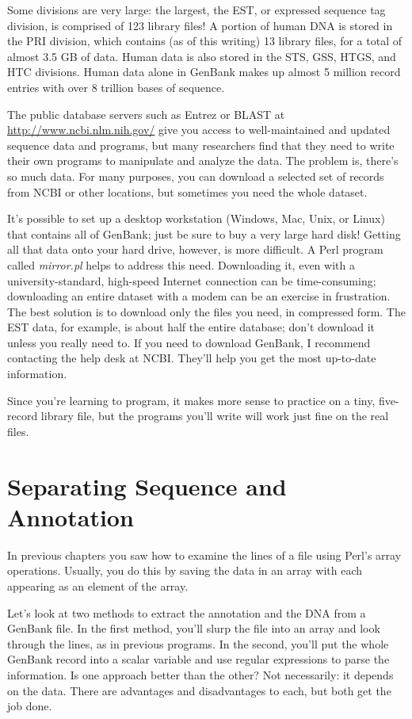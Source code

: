 Some divisions are very large: the largest, the EST, or expressed sequence tag division, is comprised of 123 library files! A portion of human DNA is stored in the PRI division, which contains (as of this writing) 13 library files, for a total of almost 3.5 GB of data. Human data is also stored in the STS, GSS, HTGS, and HTC divisions. Human data alone in GenBank makes up almost 5 million record entries with over 8 trillion bases of sequence.

The public database servers such as Entrez or BLAST at \href{http://www.ncbi.nlm.nih.gov/}{http://www.ncbi.nlm.nih.gov/} give you access to well-maintained and updated sequence data and programs, but many researchers find that they need to write their own programs to manipulate and analyze the data. The problem is, there's so much data. For many purposes, you can download a selected set of records from NCBI or other locations, but sometimes you need the whole dataset.

It's possible to set up a desktop workstation (Windows, Mac, Unix, or Linux) that contains all of GenBank; just be sure to buy a very large hard disk! Getting all that data onto your hard drive, however, is more difficult. A Perl program called \textit{mirror.pl} helps to address this need.  Downloading it, even with a university-standard, high-speed Internet connection can be time-consuming; downloading an entire dataset with a modem can be an exercise in frustration. The best solution is to download only the files you need, in compressed form. The EST data, for example, is about half the entire database; don't download it unless you really need to. If you need to download GenBank, I recommend contacting the help desk at NCBI. They'll help you get the most up-to-date information.

Since you're learning to program, it makes more sense to practice on a tiny, five-record library file, but the programs you'll write will work just fine on the real files.

\section{Separating Sequence and Annotation}
In previous chapters you saw how to examine the lines of a file using Perl's array operations. Usually, you do this by saving the data in an array with each appearing as an element of the array.

Let's look at two methods to extract the annotation and the DNA from a GenBank file. In the first method, you'll slurp the file into an array and look through the lines, as in previous programs. In the second, you'll put the whole GenBank record into a scalar variable and use regular expressions to parse the information. Is one approach better than the other? Not necessarily: it depends on the data. There are advantages and disadvantages to each, but both get the job done.


